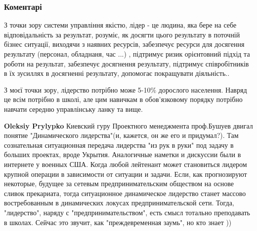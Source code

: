  
 
 
 
 
\subsubsection{Коментарі}

\begin{itemize}
 

З точки зору системи управління якістю, лідер - це людина, яка бере на себе
відповідальність за результат, розуміє, як досягти цього результату в поточній
бізнес ситуації, виходячи з наявних ресурсів, забезпечує ресурси для досягення
результату (персонал, обладнаня, час ...) , підтримує ризик орієнтовний підхід
та роботи на результат, забезпечує досягнення результату, підтримує
співробітників в їх зусиллях в досягненні результату, допомогає покращувати
діяльність..

З моєї точки зору, лідерство потрібно може 5-10\% дорослого населення. Навряд
це всім потрібно в школі, але цим навичкам в обов'язковому порядку потрібно
навчати середню управлінську ланку та вище.

\begin{itemize}
 
\textbf{Oleksiy Prylypko} Киевский гуру Проектного менеджмента проф.Бушуев
двигал понятие "Динамического лидерства"(и, кажется, он же его и придумал?).
Там сознательная ситуационная передача лидерства "из рук в руки" под задачу в
больших проектах, вроде Укрытия. Аналогичные наметки и дискуссии были в
интернете у военных США. Когда любой лейтенант может становиться лидером
крупной операции в зависимости от ситуации и задачи. Если, как прогнозируют
некоторые, будущее за сетевым предпринимательским обществом на основе сливок
прекариата, тогда ситуационное динамическое лидерство станет массово
востребованным в динамических локусах предпринимательской сети. Тогда,
"лидерство", наряду с "предпринимательством", есть смысл тотально преподавать в
школах. Сейчас это звучит, как "преждевременная заумь", но кто знает ))


\end{itemize}
\end{itemize}
